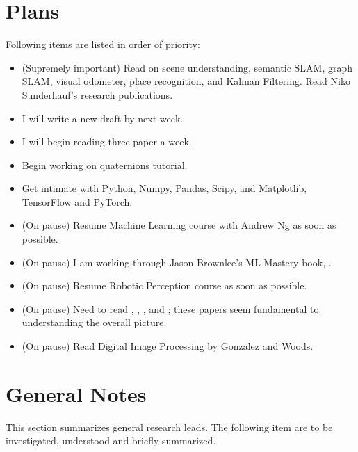 \documentclass[11pt]{article}
\begin{document}
\section{Plans}
Following items are listed in order of priority: 

\begin{itemize} 

  \item (Supremely important) Read on scene understanding, semantic SLAM, graph SLAM, visual odometer, place recognition, and Kalman Filtering. Read Niko Sunderhauf's research publications. 
  
  \item I will write a new draft by next week.	
 
 \item I will begin reading three paper a week. 
 
 \item Begin working on quaternions tutorial.  

  \item Get intimate with Python, Numpy, Pandas, Scipy, and Matplotlib, TensorFlow and PyTorch. 
  
  \item (On pause) Resume Machine Learning course with Andrew Ng as soon as possible.  
 
 \item (On pause) I am working through Jason Brownlee's ML Mastery book, \cite{MLmasteryPy}.
 
 \item (On pause) Resume Robotic Perception course as soon as possible.

 \item (On pause) Need to read \cite{ImSRwDeepCNN}, \cite{MixDNNforSISR}, \cite{mModalSemanticSLAMwProb}, and \cite{RCANforImClass}; these papers seem fundamental to understanding the overall picture.

 \item (On pause) Read Digital Image Processing by Gonzalez and Woods. 
 
 
 \end{itemize}


\section{General Notes}
This section summarizes general research leads. The following item are to be investigated, understood and briefly summarized. 
\end{document}
